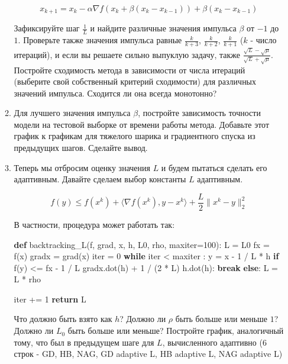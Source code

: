 \documentclass[
  russian,
  letterpaper,
  DIV=11,
  numbers=noendperiod]{scrartcl}
\newenvironment{Shaded}{\begin{snugshade}}{\end{snugshade}}
\newcommand{\BuiltInTok}[1]{\textcolor[rgb]{0.00,0.23,0.31}{#1}}
\newcommand{\ControlFlowTok}[1]{\textcolor[rgb]{0.00,0.23,0.31}{\textbf{#1}}}
\newcommand{\DecValTok}[1]{\textcolor[rgb]{0.68,0.00,0.00}{#1}}
\newcommand{\KeywordTok}[1]{\textcolor[rgb]{0.00,0.23,0.31}{\textbf{#1}}}
\newcommand{\NormalTok}[1]{\textcolor[rgb]{0.00,0.23,0.31}{#1}}
\newcommand{\OperatorTok}[1]{\textcolor[rgb]{0.37,0.37,0.37}{#1}}
\begin{document}
\begin{enumerate}
\begin{enumerate}
    \[
     \tag{NAG}
     x_{k+1} = x_k - \alpha \nabla f(x_k + \beta (x_k - x_{k-1})) + \beta (x_k - x_{k-1})  
     \]

    Зафиксируйте шаг \(\frac{1}{L}\) и найдите различные значения
    импульса \(\beta\) от \(-1\) до \(1\). Проверьте также значения
    импульса равные \(\frac{k}{k+3}\), \(\frac{k}{k+2}\),
    \(\frac{k}{k+1}\) (\(k\) - число итераций), и если вы решаете сильно
    выпуклую задачу, также
    \(\frac{\sqrt{L} - \sqrt{\mu}}{\sqrt{L} + \sqrt{\mu}}\). Постройте
    сходимость метода в зависимости от числа итераций (выберите свой
    собственный критерий сходимости) для различных значений импульса.
    Сходится ли она всегда монотонно?
  \item
    Для лучшего значения импульса \(\beta\), постройте зависимость
    точности модели на тестовой выборке от времени работы метода.
    Добавьте этот график к графикам для тяжелого шарика и градиентного
    спуска из предыдущих шагов. Сделайте вывод.
  \item
    Теперь мы отбросим оценку значения \(L\) и будем пытаться сделать
    его адаптивным. Давайте сделаем выбор константы \(L\) адаптивным.

    \[
     f(y) \leq f(x^k) + \langle \nabla f(x^k), y - x^k \rangle + \frac{L}{2}\|x^k - y\|_2^2
     \]

    В частности, процедура может работать так:

\begin{Shaded}
\begin{Highlighting}[]
\KeywordTok{def}\NormalTok{ backtracking\_L(f, grad, x, h, L0, rho, maxiter}\OperatorTok{=}\DecValTok{100}\NormalTok{):}
\NormalTok{    L }\OperatorTok{=}\NormalTok{ L0}
\NormalTok{    fx }\OperatorTok{=}\NormalTok{ f(x)}
\NormalTok{    gradx }\OperatorTok{=}\NormalTok{ grad(x)}
    \BuiltInTok{iter} \OperatorTok{=} \DecValTok{0}
    \ControlFlowTok{while} \BuiltInTok{iter} \OperatorTok{\textless{}}\NormalTok{ maxiter :}
\NormalTok{        y }\OperatorTok{=}\NormalTok{ x }\OperatorTok{{-}} \DecValTok{1} \OperatorTok{/}\NormalTok{ L }\OperatorTok{*}\NormalTok{ h}
        \ControlFlowTok{if}\NormalTok{ f(y) }\OperatorTok{\textless{}=}\NormalTok{ fx }\OperatorTok{{-}} \DecValTok{1} \OperatorTok{/}\NormalTok{ L gradx.dot(h) }\OperatorTok{+} \DecValTok{1} \OperatorTok{/}\NormalTok{ (}\DecValTok{2} \OperatorTok{*}\NormalTok{ L) h.dot(h):}
            \ControlFlowTok{break}
        \ControlFlowTok{else}\NormalTok{:}
\NormalTok{            L }\OperatorTok{=}\NormalTok{ L }\OperatorTok{*}\NormalTok{ rho}

        \BuiltInTok{iter} \OperatorTok{+=} \DecValTok{1}
    \ControlFlowTok{return}\NormalTok{ L}
\end{Highlighting}
\end{Shaded}

    Что должно быть взято как \(h\)? Должно ли \(\rho\) быть больше или
    меньше \(1\)? Должно ли \(L_0\) быть больше или меньше? Постройте
    график, аналогичный тому, что был в предыдущем шаге для \(L\),
    вычисленного адаптивно (6 строк - GD, HB, NAG, GD adaptive L, HB
    adaptive L, NAG adaptive L)
  \end{enumerate}
\end{enumerate}
\end{document}

